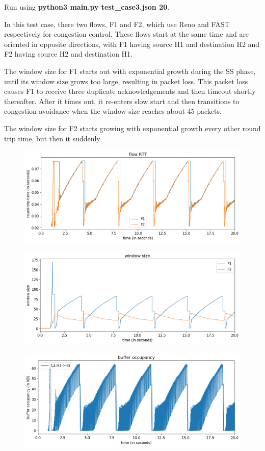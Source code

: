 \documentclass{article}
\begin{document}
Run using \textbf{python3 main.py test\_case3.json 20}.

In this test case, there two flows, F1 and F2, which use Reno and FAST respectively for congestion control. These flows start at the same time and are oriented in opposite directions, with F1 having source H1 and destination H2 and F2 having source H2 and destination H1. 

The window size for F1 starts out with exponential growth during the SS phase, until its window size grows too large, resulting in packet loss. This packet loss causes F1 to receive three duplicate acknowledgements and then timeout shortly thereafter. After it times out, it re-enters slow start and then transitions to congestion avoidance when the window size reaches about 45 packets. 

The window size for F2 starts growing with exponential growth every other round trip time, but then it suddenly 

\begin{figure}[H]
\centering
\includegraphics[width = \textwidth]{test_case3 flow RTT.png}
\end{figure}

\begin{figure}[H]
\centering
\includegraphics[width = \textwidth]{test_case3 window size.png}
\end{figure}

\begin{figure}[H]
\centering
\includegraphics[width = \textwidth]{test_case3 buffer occupancy.png}
\end{figure}
\end{document}
